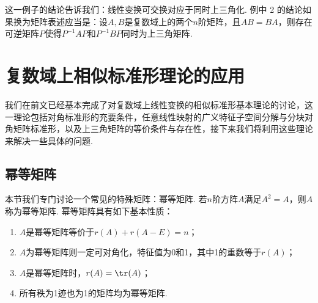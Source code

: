 这一例子的结论告诉我们：线性变换可交换对应于同时上三角化. 例中 2 的结论如果换为矩阵表述应当是：设$A,B$是复数域上的两个$n$阶矩阵，且$AB=BA$，则存在可逆矩阵$P$使得$P^{-1}AP$和$P^{-1}BP$同时为上三角矩阵.

\section{复数域上相似标准形理论的应用}

我们在前文已经基本完成了对复数域上线性变换的相似标准形基本理论的讨论，这一理论包括对角标准形的充要条件，任意线性映射的广义特征子空间分解与分块对角矩阵标准形，以及上三角矩阵的等价条件与存在性，接下来我们将利用这些理论来解决一些具体的问题.

\subsection{幂等矩阵}

本节我们专门讨论一个常见的特殊矩阵：幂等矩阵. 若$n$阶方阵$A$满足$A^2=A$，则$A$称为幂等矩阵. 幂等矩阵具有如下基本性质：
\begin{enumerate}
    \item $A$是幂等矩阵等价于$r(A)+r(A-E)=n$；

    \item $A$为幂等矩阵则一定可对角化，特征值为0和1，其中1的重数等于$r(A)$；

    \item $A$是幂等矩阵时，$r(A)=\tr(A)$；

    \item 所有秩为1迹也为1的矩阵均为幂等矩阵.
\end{enumerate}

